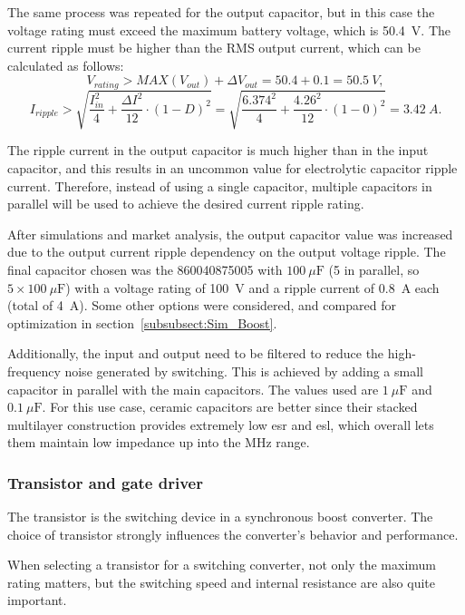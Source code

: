     The same process was repeated for the output capacitor, but in this case the voltage rating must exceed the maximum battery voltage, which is 50.4~V. The current ripple must be higher than the RMS output current, which can be calculated as follows:
    \begin{equation}
        V_{rating} > MAX(V_{out}) + \Delta V_{out} = 50.4 + 0.1 = 50.5~V,
    \end{equation}
    \begin{equation}
        I_{ripple} > \sqrt{\frac{I_{in}^2}{4} + \frac{\Delta I ^2}{12} \cdot (1-D)^2} = \sqrt{\frac{6.374^2}{4} + \frac{4.26 ^2}{12} \cdot (1-0)^2} = 3.42~A.
    \end{equation}

    The ripple current in the output capacitor is much higher than in the input capacitor, and this results in an uncommon value for electrolytic capacitor ripple current. Therefore, instead of using a single capacitor, multiple capacitors in parallel will be used to achieve the desired current ripple rating.

    After simulations and market analysis, the output capacitor value was increased due to the output current ripple dependency on the output voltage ripple. The final capacitor chosen was the 860040875005 with $100~\mu\mathrm{F}$ (5 in parallel, so $5\times100~\mu\mathrm{F}$) with a voltage rating of 100~V and a ripple current of 0.8~A each (total of 4~A). Some other options were considered, and compared for optimization in section~\ref{subsubsect:Sim_Boost}. 

    Additionally, the input and output need to be filtered to reduce the high-frequency noise generated by switching. This is achieved by adding a small capacitor in parallel with the main capacitors. The values used are $1~\mu\mathrm{F}$ and $0.1~\mu\mathrm{F}$. For this use case, ceramic capacitors are better since their stacked multilayer construction provides extremely low \ac{esr} and \ac{esl}, which overall lets them maintain low impedance up into the MHz range.

\subsubsection{Transistor and gate driver}
    The transistor is the switching device in a synchronous boost converter. The choice of transistor strongly influences the converter's behavior and performance.

    When selecting a transistor for a switching converter, not only the maximum rating matters, but the switching speed and internal resistance are also quite important. 
    
